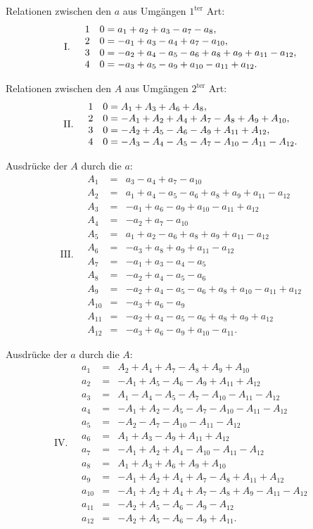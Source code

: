 \documentclass[10pt]{article}
\begin{document}
\noindent Relationen zwischen den \(a\) aus Umgängen \(1^{\mathrm{ter}}\) Art:
\[
\mathrm{I.}\quad
\begin{array}{r@{\quad}l}
1&0=a_1+a_2+a_3-a_7-a_8,\\
2&0=-a_1+a_3-a_4+a_7-a_{10},\\
3&0=-a_2+a_4-a_5-a_6+a_8+a_9+a_{11}-a_{12},\\
4&0=-a_3+a_5-a_9+a_{10}-a_{11}+a_{12}.
\end{array}
\]

\noindent Relationen zwischen den \(A\) aus Umgängen \(2^{\mathrm{ter}}\) Art:
\[
\mathrm{II.}\quad
\begin{array}{r@{\quad}l}
1&0=A_1+A_3+A_6+A_8,\\
2&0=-A_1+A_2+A_4+A_7-A_8+A_9+A_{10},\\
3&0=-A_2+A_5-A_6-A_9+A_{11}+A_{12},\\
4&0=-A_3-A_4-A_5-A_7-A_{10}-A_{11}-A_{12}.
\end{array}
\]

\noindent Ausdrücke der \(A\) durch die \(a\):
\[
\mathrm{III.}\quad
\begin{array}{rcl}
A_1&=&a_3-a_4+a_7-a_{10}\\
A_2&=&a_1+a_4-a_5-a_6+a_8+a_9+a_{11}-a_{12}\\
A_3&=&-a_1+a_6-a_9+a_{10}-a_{11}+a_{12}\\
A_4&=&-a_2+a_7-a_{10}\\
A_5&=&a_1+a_2-a_6+a_8+a_9+a_{11}-a_{12}\\
A_6&=&-a_3+a_8+a_9+a_{11}-a_{12}\\
A_7&=&-a_1+a_3-a_4-a_5\\
A_8&=&-a_2+a_4-a_5-a_6\\
A_9&=&-a_2+a_4-a_5-a_6+a_8+a_{10}-a_{11}+a_{12}\\
A_{10}&=&-a_3+a_6-a_9\\
A_{11}&=&-a_2+a_4-a_5-a_6+a_8+a_9+a_{12}\\
A_{12}&=&-a_3+a_6-a_9+a_{10}-a_{11}.
\end{array}
\]

\noindent Ausdrücke der \(a\) durch die \(A\):
\[
\mathrm{IV.}\quad
\begin{array}{rcl}
a_1&=&A_2+A_4+A_7-A_8+A_9+A_{10}\\
a_2&=&-A_1+A_5-A_6-A_9+A_{11}+A_{12}\\
a_3&=&A_1-A_4-A_5-A_7-A_{10}-A_{11}-A_{12}\\
a_4&=&-A_1+A_2-A_5-A_7-A_{10}-A_{11}-A_{12}\\
a_5&=&-A_2-A_7-A_{10}-A_{11}-A_{12}\\
a_6&=&A_1+A_3-A_9+A_{11}+A_{12}\\
a_7&=&-A_1+A_2+A_4-A_{10}-A_{11}-A_{12}\\
a_8&=&A_1+A_3+A_6+A_9+A_{10}\\
a_9&=&-A_1+A_2+A_4+A_7-A_8+A_{11}+A_{12}\\
a_{10}&=&-A_1+A_2+A_4+A_7-A_8+A_9-A_{11}-A_{12}\\
a_{11}&=&-A_2+A_5-A_6-A_9-A_{12}\\
a_{12}&=&-A_2+A_5-A_6-A_9+A_{11}.
\end{array}
\]
\end{document}
